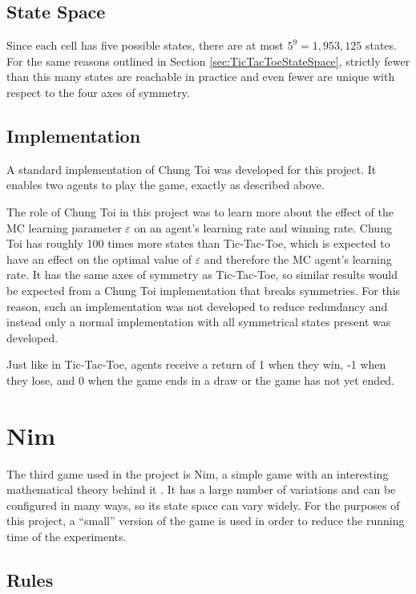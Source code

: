 \documentclass[11pt,a4paper]{report}
\begin{document}
\subsection{State Space}

Since each cell has five possible states, there are at most $5^9 = 1,953,125$ states. For the same reasons outlined in Section \ref{sec:TicTacToeStateSpace}, strictly fewer than this many states are reachable in practice and even fewer are unique with respect to the four axes of symmetry.


\subsection{Implementation}

A standard implementation of Chung Toi was developed for this project. It enables two agents to play the game, exactly as described above.

The role of Chung Toi in this project was to learn more about the effect of the MC learning parameter $\varepsilon$ on an agent's learning rate and winning rate. Chung Toi has roughly 100 times more states than Tic-Tac-Toe, which is expected to have an effect on the optimal value of $\varepsilon$ and therefore the MC agent's learning rate. It has the same axes of symmetry as Tic-Tac-Toe, so similar results would be expected from a Chung Toi implementation that breaks symmetries. For this reason, such an implementation was not developed to reduce redundancy and instead only a normal implementation with all symmetrical states present was developed.

Just like in Tic-Tac-Toe, agents receive a return of 1 when they win, -1 when they lose, and 0 when the game ends in a draw or the game has not yet ended.


\section{Nim}
\label{sec:Nim}

The third game used in the project is Nim, a simple game with an interesting mathematical theory behind it \cite{nim-rules}. It has a large number of variations and can be configured in many ways, so its state space can vary widely. For the purposes of this project, a ``small'' version of the game is used in order to reduce the running time of the experiments.


\subsection{Rules}
\end{document}
